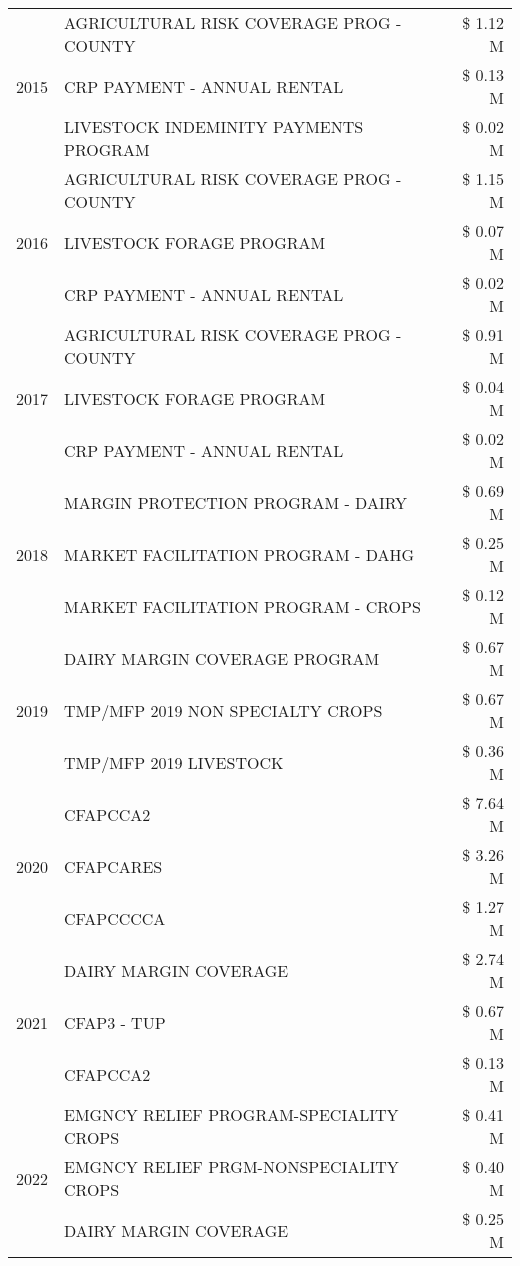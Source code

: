 \begin{tabular}{llr}
\cline{1-3}
\multirow[t]{3}{*}{2015} & AGRICULTURAL RISK COVERAGE PROG - COUNTY & \$ 1.12 M \\
 & CRP PAYMENT - ANNUAL RENTAL & \$ 0.13 M \\
 & LIVESTOCK INDEMINITY PAYMENTS PROGRAM & \$ 0.02 M \\
\cline{1-3}
\multirow[t]{3}{*}{2016} & AGRICULTURAL RISK COVERAGE PROG - COUNTY & \$ 1.15 M \\
 & LIVESTOCK FORAGE PROGRAM & \$ 0.07 M \\
 & CRP PAYMENT - ANNUAL RENTAL & \$ 0.02 M \\
\cline{1-3}
\multirow[t]{3}{*}{2017} & AGRICULTURAL RISK COVERAGE PROG - COUNTY & \$ 0.91 M \\
 & LIVESTOCK FORAGE PROGRAM & \$ 0.04 M \\
 & CRP PAYMENT - ANNUAL RENTAL & \$ 0.02 M \\
\cline{1-3}
\multirow[t]{3}{*}{2018} & MARGIN PROTECTION PROGRAM - DAIRY & \$ 0.69 M \\
 & MARKET FACILITATION PROGRAM - DAHG & \$ 0.25 M \\
 & MARKET FACILITATION PROGRAM - CROPS & \$ 0.12 M \\
\cline{1-3}
\multirow[t]{3}{*}{2019} & DAIRY MARGIN COVERAGE PROGRAM & \$ 0.67 M \\
 & TMP/MFP 2019 NON SPECIALTY CROPS & \$ 0.67 M \\
 & TMP/MFP 2019 LIVESTOCK & \$ 0.36 M \\
\cline{1-3}
\multirow[t]{3}{*}{2020} & CFAPCCA2 & \$ 7.64 M \\
 & CFAPCARES & \$ 3.26 M \\
 & CFAPCCCCA & \$ 1.27 M \\
\cline{1-3}
\multirow[t]{3}{*}{2021} & DAIRY MARGIN COVERAGE & \$ 2.74 M \\
 & CFAP3 - TUP & \$ 0.67 M \\
 & CFAPCCA2 & \$ 0.13 M \\
\cline{1-3}
\multirow[t]{3}{*}{2022} & EMGNCY RELIEF PROGRAM-SPECIALITY CROPS & \$ 0.41 M \\
 & EMGNCY RELIEF PRGM-NONSPECIALITY CROPS & \$ 0.40 M \\
 & DAIRY MARGIN COVERAGE & \$ 0.25 M \\
\cline{1-3}
\bottomrule
\end{tabular}

